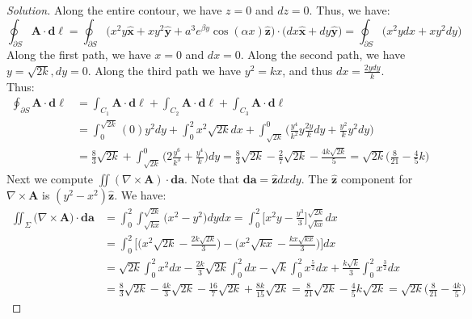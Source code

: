 \documentclass{article}
\theoremstyle{mystyle}
\begin{document}
\begin{proof}[Solution]
Along the entire contour, we have $z=0$ and $dz=0$. Thus, we have:
\begin{equation*}
    \oint_{\partial S}\mathbf{A}\cdot\boldsymbol{d\ell}=\oint_{\partial S}\big(x^{2}y\hat{\mathbf{x}}+xy^{2}\hat{\mathbf{y}}+a^{3}e^{\beta y}\cos(\alpha x)\hat{\mathbf{z}}\big)\cdot\big(dx\hat{\mathbf{x}}+dy\hat{\mathbf{y}}\big)=\oint_{\partial S}\big(x^{2}ydx+xy^{2}dy\big)
\end{equation*}
Along the first path, we have $x=0$ and $dx=0$. Along the second path, we have $y=\sqrt{2k}, dy=0$. Along the third path we have $y^2=kx$, and thus $dx = \frac{2ydy}{k}$. Thus:
\begin{align*}
    \oint_{\partial S}\mathbf{A}\cdot\boldsymbol{d\ell}&=\int_{C_{1}}\mathbf{A}\cdot\boldsymbol{d\ell}+\int_{C_{2}}\mathbf{A}\cdot\boldsymbol{d\ell}+\int_{C_{3}}\mathbf{A}\cdot\boldsymbol{d\ell}\\
    &=\int_{0}^{\sqrt{2k}}(0)y^{2}dy+\int_{0}^{2}x^{2}\sqrt{2k}dx+\int_{\sqrt{2k}}^{0}\big(\frac{y^{4}}{k^2}y\frac{2y}{k}dy+\frac{y^{2}}{k}y^{2}dy\big)\\
    &=\frac{8}{3}\sqrt{2k}+\int_{\sqrt{2k}}^{0}\big(2\frac{y^{6}}{k^{3}}+\frac{y^{4}}{k}\big)dy=\frac{8}{3}\sqrt{2k}-\frac{2}{7}\sqrt{2k}-\frac{4k\sqrt{2k}}{5}=\sqrt{2k}\big(\frac{8}{21}-\frac{4}{5}k\big)
\end{align*}
Next we compute $\iint (\nabla \times \mathbf{A})\cdot \boldsymbol{da}$. Note that $\boldsymbol{da} = \hat{\mathbf{z}}dxdy$. The $\hat{\mathbf{z}}$ component for $\nabla \times \mathbf{A}$ is $(y^{2}-x^{2})\hat{\mathbf{z}}$. We have:
\begin{align*}
    \iint_{\Sigma}\big(\nabla\times\mathbf{A}\big)\cdot\boldsymbol{da}&=\int_{0}^{2}\int_{\sqrt{kx}}^{\sqrt{2k}} \big(x^{2}-y^{2}\big)dydx=\int_{0}^{2}\bigg[x^{2}y-\frac{y^{3}}{3}\bigg]_{\sqrt{kx}}^{\sqrt{2k}}dx\\
    &= \int_{0}^{2}\bigg[\bigg(x^{2}\sqrt{2k} - \frac{2k\sqrt{2k}}{3}\bigg) - \bigg(x^{2}\sqrt{kx} - \frac{kx\sqrt{kx}}{3}\bigg)\bigg]dx\\
    &= \sqrt{2k}\int_{0}^{2}x^2 dx - \frac{2k}{3}\sqrt{2k}\int_{0}^{2}dx - \sqrt{k}\int_{0}^{2}x^{\frac{5}{2}}dx + \frac{k\sqrt{k}}{3}\int_{0}^{2}x^{\frac{3}{2}}dx\\
    &=\frac{8}{3}\sqrt{2k}-\frac{4k}{3}\sqrt{2k}-\frac{16}{7}\sqrt{2k}+\frac{8k}{15}\sqrt{2k}=\frac{8}{21}\sqrt{2k}-\frac{4}{5}k\sqrt{2k}=\sqrt{2k}\big(\frac{8}{21}-\frac{4k}{5}\big)
\end{align*}
\end{proof}
\end{document}
